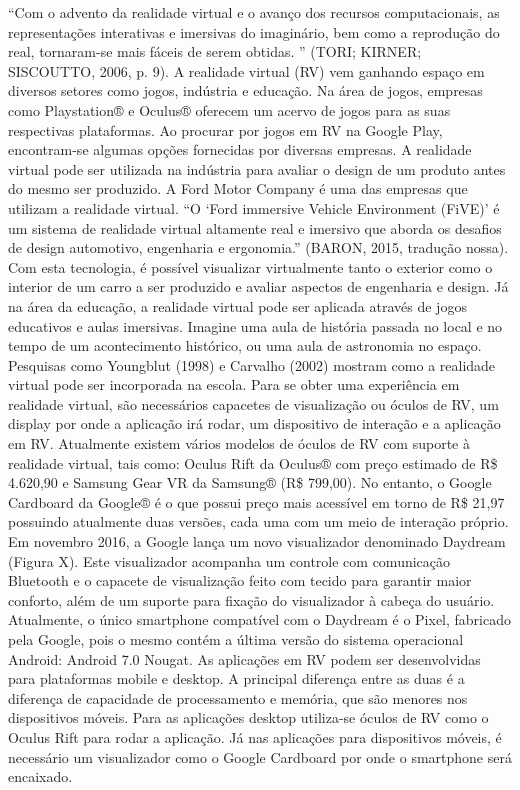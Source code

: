 “Com o advento da realidade virtual e o avanço dos recursos computacionais, as representações interativas e imersivas do imaginário, bem como a reprodução do real, tornaram-se mais fáceis de serem obtidas. ” (TORI; KIRNER; SISCOUTTO, 2006, p. 9).
A realidade virtual (RV) vem ganhando espaço em diversos setores como jogos, indústria e educação. Na área de jogos, empresas como Playstation® e Oculus® oferecem um acervo de jogos para as suas respectivas plataformas. Ao procurar por jogos em RV na Google Play, encontram-se algumas opções fornecidas por diversas empresas.
A realidade virtual pode ser utilizada na indústria para avaliar o design de um produto antes do mesmo ser produzido. A Ford Motor Company é uma das empresas que utilizam a realidade virtual. “O ‘Ford immersive Vehicle Environment (FiVE)’ é um sistema de realidade virtual altamente real e imersivo que aborda os desafios de design automotivo, engenharia e ergonomia.” (BARON, 2015, tradução nossa). Com esta tecnologia, é possível visualizar virtualmente tanto o exterior como o interior de um carro a ser produzido e avaliar aspectos de engenharia e design.
Já na área da educação, a realidade virtual pode ser aplicada através de jogos educativos e aulas imersivas. Imagine uma aula de história passada no local e no tempo de um acontecimento histórico, ou uma aula de astronomia no espaço. Pesquisas como Youngblut (1998) e Carvalho (2002) mostram como a realidade virtual pode ser incorporada na escola.
Para se obter uma experiência em realidade virtual, são necessários capacetes de visualização ou óculos de RV, um display por onde a aplicação irá rodar, um dispositivo de interação e a aplicação em RV. 
Atualmente existem vários modelos de óculos de RV com suporte à realidade virtual, tais como: Oculus Rift da Oculus® com preço estimado de R\$ 4.620,90 e Samsung Gear VR da Samsung® (R\$ 799,00). No entanto, o Google Cardboard da Google® é o que possui preço mais acessível em torno de R\$ 21,97 possuindo atualmente duas versões, cada uma com um meio de interação próprio. Em novembro 2016, a Google lança um novo visualizador denominado Daydream (Figura X). Este visualizador acompanha um controle com comunicação Bluetooth e o capacete de visualização feito com tecido para garantir maior conforto, além de um suporte para fixação do visualizador à cabeça do usuário. Atualmente, o único smartphone compatível com o Daydream é o Pixel, fabricado pela Google, pois o mesmo contém a última versão do sistema operacional Android: Android 7.0 Nougat.
As aplicações em RV podem ser desenvolvidas para plataformas mobile e desktop. A principal diferença entre as duas é a diferença de capacidade de processamento e memória, que são menores nos dispositivos móveis. Para as aplicações desktop utiliza-se óculos de RV como o Oculus Rift para rodar a aplicação. Já nas aplicações para dispositivos móveis, é necessário um visualizador como o Google Cardboard por onde o smartphone será encaixado.
